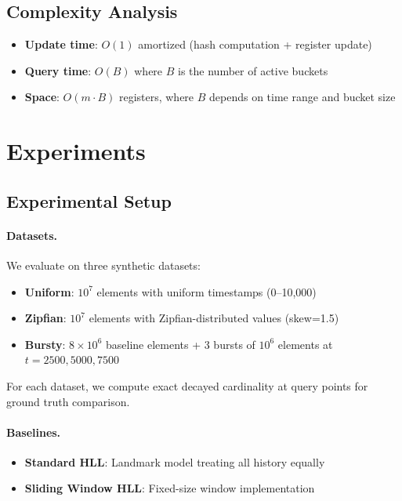 \documentclass{article}
\begin{document}
\subsection{Complexity Analysis}

\begin{itemize}
    \item \textbf{Update time}: $O(1)$ amortized (hash computation + register update)
    \item \textbf{Query time}: $O(B)$ where $B$ is the number of active buckets
    \item \textbf{Space}: $O(m \cdot B)$ registers, where $B$ depends on time range and bucket size
\end{itemize}

\section{Experiments}\label{sec:experiments}

\subsection{Experimental Setup}

\paragraph{Datasets.}
We evaluate on three synthetic datasets:
\begin{itemize}
    \item \textbf{Uniform}: $10^7$ elements with uniform timestamps (0--10,000)
    \item \textbf{Zipfian}: $10^7$ elements with Zipfian-distributed values (skew=1.5)
    \item \textbf{Bursty}: $8\times 10^6$ baseline elements + 3 bursts of $10^6$ elements at $t=2500, 5000, 7500$
\end{itemize}

For each dataset, we compute exact decayed cardinality at query points for ground truth comparison.

\paragraph{Baselines.}
\begin{itemize}
    \item \textbf{Standard HLL}: Landmark model treating all history equally
    \item \textbf{Sliding Window HLL}: Fixed-size window implementation \citep{chabchoub2010sliding}
\end{itemize}
\end{document}
